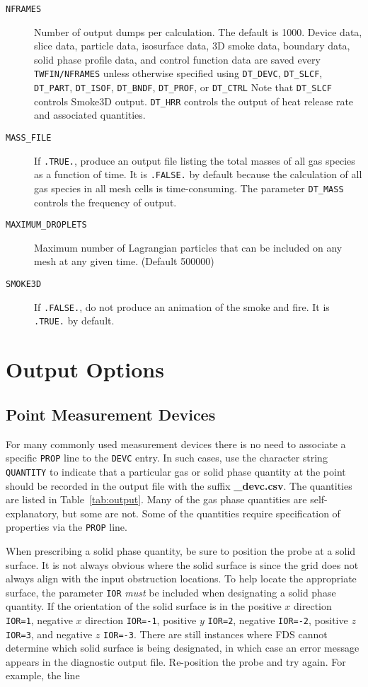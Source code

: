 \documentclass[11pt]{book}
\newcommand{\ct}{\tt\small}
\begin{document}
\begin{description}
\item[{\ct NFRAMES}] Number of output dumps per calculation. The default is 1000.
Device data, slice data, particle data, isosurface data, 3D smoke data, boundary data, solid phase profile data, and
control function data are saved every {\ct TWFIN/NFRAMES} unless otherwise specified
using {\ct DT\_DEVC}, {\ct DT\_SLCF}, {\ct DT\_PART}, {\ct DT\_ISOF}, {\ct DT\_BNDF}, {\ct DT\_PROF},
or {\ct DT\_CTRL} Note that {\ct DT\_SLCF} controls Smoke3D output. {\ct DT\_HRR} controls the
output of heat release rate and associated quantities.
\item[{\ct MASS\_FILE}] If {\ct .TRUE.}, produce an output file listing the total masses of all gas species as a function of time. It is {\ct .FALSE.} by default because the calculation
of all gas species in all mesh cells is time-consuming. The parameter {\ct DT\_MASS} controls the frequency of output.
\item[{\ct MAXIMUM\_DROPLETS}] Maximum number of Lagrangian particles that can be included on any
mesh at any given time. (Default 500000)
\item[{\ct SMOKE3D}] If {\ct .FALSE.}, do not produce an animation of the smoke and fire. It is {\ct .TRUE.} by default.
\end{description}


\section{Output Options}

\subsection{Point Measurement Devices}
For many commonly used measurement devices there is no need to associate a
specific {\ct PROP} line to the {\ct DEVC} entry. In such cases, use the character string
{\ct QUANTITY} to indicate that a particular gas or solid phase quantity at the point should be recorded in
the output file with the suffix {\bf \_devc.csv}. The quantities are listed in Table~\ref{tab:output}.
Many of the gas phase quantities are self-explanatory, but some are not. Some of the quantities require specification of
properties via the {\ct PROP} line.

When prescribing a solid phase quantity, be sure to position the
probe at a solid surface. It is not always obvious where the
solid surface is since the grid does not always align with the input obstruction
locations. To help locate the appropriate surface, the parameter {\ct IOR} {\em must} be included
when designating a solid phase quantity.
If the orientation of the solid surface is in the
positive $x$ direction {\ct IOR=1}, negative $x$ direction {\ct IOR=-1},
positive $y$ {\ct IOR=2}, negative {\ct IOR=-2}, positive $z$ {\ct IOR=3},
and negative $z$ {\ct IOR=-3}. There are still instances where FDS cannot
determine which solid surface is being designated, in which case an
error message appears in the diagnostic output file.
Re-position the probe and try again. For example, the line
\end{document}
